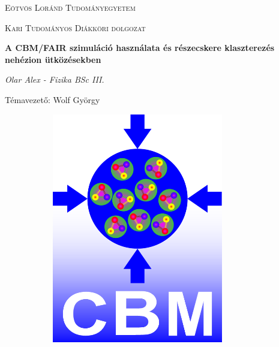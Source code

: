 \documentclass[12pt,a4paper]{report}
\begin{document}
\begin{titlepage}
	\centering
	{\scshape\LARGE Eötvös Loránd Tudományegyetem \par}
	\vspace{1cm}
	{\scshape\Large Kari Tudományos Diákköri dolgozat \par}
	\vspace{1.5cm}
	{\huge\bfseries A CBM/FAIR szimuláció használata és részecskere klaszterezés nehézion ütközésekben\par}
	\vspace{2cm}
	{\Large\itshape Olar Alex - Fizika BSc III.\par}
	\vfill
	{\large Témavezető: Wolf György\par} 
	\begin{figure}[H]
	\centering
	\begin{subfigure}{.39\textwidth}
		\includegraphics[width=0.82\textwidth]{gsi.png}
	\end{subfigure}
	\begin{subfigure}{.39\textwidth}

\end{subfigure}
\end{figure}
\end{titlepage}
\end{document}
